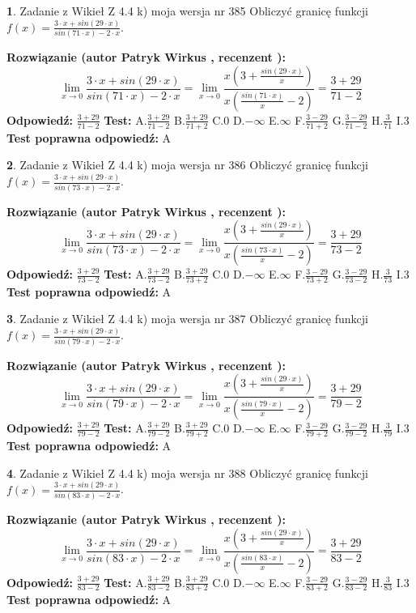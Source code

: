 \documentclass[12pt, a4paper]{article}
\theoremstyle{definition} %
\newtheorem{zad}{}
\newcommand{\zadStart}[1]{\begin{zad}#1\newline}
\newcommand{\zadStop}{\end{zad}}
\newcommand{\rozwStart}[2]{\noindent \textbf{Rozwiązanie (autor #1 , recenzent #2): }\newline}
\newcommand{\rozwStop}{\newline}
\newcommand{\odpStart}{\noindent \textbf{Odpowiedź:}\newline}
\newcommand{\odpStop}{\newline}
\newcommand{\testStart}{\noindent \textbf{Test:}\newline}
\newcommand{\testStop}{\newline}
\newcommand{\kluczStart}{\noindent \textbf{Test poprawna odpowiedź:}\newline}
\newcommand{\kluczStop}{\newline}
\begin{document}
\zadStart{Zadanie z Wikieł Z 4.4 k) moja wersja nr 385}
Obliczyć granicę funkcji $f(x)=\frac{3\cdot x +sin(29\cdot x)}{sin(71\cdot x) -2\cdot x}$.
\zadStop
\rozwStart{Patryk Wirkus}{}
$$\lim\limits_{x\to 0}\frac{3\cdot x +sin(29\cdot x)}{sin(71\cdot x) -2\cdot x}
=\lim\limits_{x\to 0}\frac{x(3+\frac{sin(29\cdot x)}{x})}{x(\frac{sin(71\cdot x)}{x}-2)}
=\frac{3+29}{71-2}$$
\rozwStop
\odpStart
$\frac{3+29}{71-2}$
\odpStop
\testStart
A.$\frac{3+29}{71-2}$
B.$\frac{3+29}{71+2}$
C.$0$
D.$-\infty$
E.$\infty$
F.$\frac{3-29}{71+2}$
G.$\frac{3-29}{71-2}$
H.$\frac{3}{71}$
I.$3$
\testStop
\kluczStart
A
\kluczStop



\zadStart{Zadanie z Wikieł Z 4.4 k) moja wersja nr 386}
Obliczyć granicę funkcji $f(x)=\frac{3\cdot x +sin(29\cdot x)}{sin(73\cdot x) -2\cdot x}$.
\zadStop
\rozwStart{Patryk Wirkus}{}
$$\lim\limits_{x\to 0}\frac{3\cdot x +sin(29\cdot x)}{sin(73\cdot x) -2\cdot x}
=\lim\limits_{x\to 0}\frac{x(3+\frac{sin(29\cdot x)}{x})}{x(\frac{sin(73\cdot x)}{x}-2)}
=\frac{3+29}{73-2}$$
\rozwStop
\odpStart
$\frac{3+29}{73-2}$
\odpStop
\testStart
A.$\frac{3+29}{73-2}$
B.$\frac{3+29}{73+2}$
C.$0$
D.$-\infty$
E.$\infty$
F.$\frac{3-29}{73+2}$
G.$\frac{3-29}{73-2}$
H.$\frac{3}{73}$
I.$3$
\testStop
\kluczStart
A
\kluczStop



\zadStart{Zadanie z Wikieł Z 4.4 k) moja wersja nr 387}
Obliczyć granicę funkcji $f(x)=\frac{3\cdot x +sin(29\cdot x)}{sin(79\cdot x) -2\cdot x}$.
\zadStop
\rozwStart{Patryk Wirkus}{}
$$\lim\limits_{x\to 0}\frac{3\cdot x +sin(29\cdot x)}{sin(79\cdot x) -2\cdot x}
=\lim\limits_{x\to 0}\frac{x(3+\frac{sin(29\cdot x)}{x})}{x(\frac{sin(79\cdot x)}{x}-2)}
=\frac{3+29}{79-2}$$
\rozwStop
\odpStart
$\frac{3+29}{79-2}$
\odpStop
\testStart
A.$\frac{3+29}{79-2}$
B.$\frac{3+29}{79+2}$
C.$0$
D.$-\infty$
E.$\infty$
F.$\frac{3-29}{79+2}$
G.$\frac{3-29}{79-2}$
H.$\frac{3}{79}$
I.$3$
\testStop
\kluczStart
A
\kluczStop



\zadStart{Zadanie z Wikieł Z 4.4 k) moja wersja nr 388}
Obliczyć granicę funkcji $f(x)=\frac{3\cdot x +sin(29\cdot x)}{sin(83\cdot x) -2\cdot x}$.
\zadStop
\rozwStart{Patryk Wirkus}{}
$$\lim\limits_{x\to 0}\frac{3\cdot x +sin(29\cdot x)}{sin(83\cdot x) -2\cdot x}
=\lim\limits_{x\to 0}\frac{x(3+\frac{sin(29\cdot x)}{x})}{x(\frac{sin(83\cdot x)}{x}-2)}
=\frac{3+29}{83-2}$$
\rozwStop
\odpStart
$\frac{3+29}{83-2}$
\odpStop
\testStart
A.$\frac{3+29}{83-2}$
B.$\frac{3+29}{83+2}$
C.$0$
D.$-\infty$
E.$\infty$
F.$\frac{3-29}{83+2}$
G.$\frac{3-29}{83-2}$
H.$\frac{3}{83}$
I.$3$
\testStop
\kluczStart
A
\kluczStop
\end{document}
